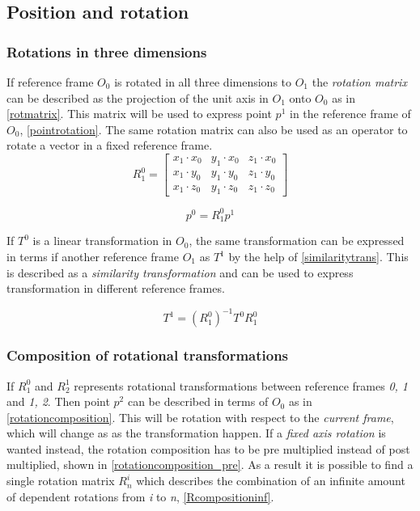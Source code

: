 \subsection{Position and rotation}

\subsubsection{Rotations in three dimensions}

If reference frame $O_0$ is rotated in all three dimensions to $O_1$ the \textit{rotation matrix} can be described as the projection of the unit axis in $O_1$ onto $O_0$ as in \eqref{rotmatrix}. This matrix will be used to express point $p^1$ in the reference frame of $O_0$, \eqref{pointrotation}. The same rotation matrix can also be used as an operator to rotate a vector in a fixed reference frame.
\begin{equation}\label{rotmatrix}
R^0_1=\begin{bmatrix}
x_1\cdot x_0 & y_1\cdot x_0 & z_1\cdot x_0\\ 
x_1\cdot y_0 & y_1\cdot y_0 & z_1\cdot y_0\\ 
x_1\cdot z_0 & y_1\cdot z_0 & z_1\cdot z_0
\end{bmatrix}
\end{equation}

\begin{equation}\label{pointrotation}
p^0 = R^0_1p^1
\end{equation}

If $T^0$ is a linear transformation in $O_0$, the same transformation can be expressed in terms if another reference frame $O_1$ as $T^1$ by the help of \eqref{similaritytrans}. This is described as a \textit{similarity transformation} and can be used to express transformation in different reference frames.

\begin{equation}\label{similaritytrans}
T^1 = (R^0_1)^{-1}T^0 R^0_1
\end{equation}

\subsubsection{Composition of rotational transformations}

If $R^0_1$ and $R^1_2$ represents rotational transformations between reference frames \textit{0, 1} and \textit{1, 2}. Then point $p^2$ can be described in terms of $O_0$ as in \eqref{rotationcomposition}. This will be rotation with respect to the \textit{current frame}, which will change as as the transformation happen. If a \textit{fixed axis rotation} is wanted instead, the rotation composition has to be pre multiplied instead of post multiplied, shown in \eqref{rotationcomposition_pre}. As a result it is possible to find a single rotation matrix \textit{$R^i_n$} which describes the combination of an infinite amount of dependent rotations from \textit{i} to \textit{n}, \eqref{Rcompositioninf}.


